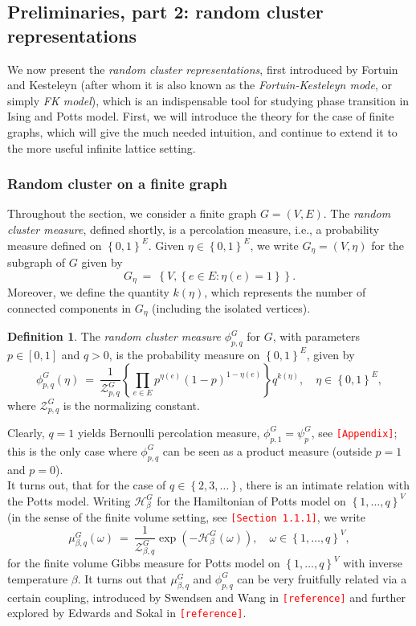 \documentclass[12pt]{article}
\renewcommand{\H}{\mathcal{H}}
\newcommand{\ZZ}{\mathcal{Z}}
\newcommand{\set}[1]{\left\{#1\right\}}
\newcommand{\1}{\mathbbm{1}}
\newcommand{\5}{\vspace{0.5cm}}
\theoremstyle{definition}
\newtheorem{df}[thm]{Definition}
\begin{document}
\subsection{Preliminaries, part 2: random cluster representations}

We now present the \textit{random cluster representations}, first introduced by Fortuin and Kesteleyn (after whom it is also known as the \textit{Fortuin-Kesteleyn mode}, or simply \textit{FK model}), which is an indispensable tool for studying phase transition in Ising and Potts model. First, we will introduce the theory for the case of finite graphs, which will give the much needed intuition, and continue to extend it to the more useful infinite lattice setting.


\subsubsection{Random cluster on a finite graph}

Throughout the section, we consider a finite graph $G=(V,E)$. The \textit{random cluster measure}, defined shortly, is a percolation measure, i.e., a probability measure defined on $\set{0,1}^E$. Given $\eta\in\set{0,1}^E$, we write $G_\eta=(V,\eta)$ for the subgraph of $G$ given by 
$$G_\eta ~=~ \set{V,\set{e\in E:\eta(e)=1}}.$$
Moreover, we define the quantity $k(\eta)$, which represents the number of connected components in $G_\eta$ (including the isolated vertices).

\begin{df}
The \textit{random cluster measure} $\phi_{p,q}^G$ for $G$, with parameters $p\in[0,1]$ and $q>0$, is the probability measure on $\set{0,1}^E$, given by
$$\phi_{p,q}^{G}(\eta) ~=~ \frac{1}{\ZZ_{p,q}^G}\set{\prod_{e\in E}p^{\eta(e)}(1-p)^{1-\eta(e)}}q^{k(\eta)}, \quad \eta\in\set{0,1}^E,$$
where $\ZZ_{p,q}^{G}$ is the normalizing constant.
\end{df} 

Clearly, $q=1$ yields Bernoulli percolation measure, $\phi_{p,1}^G=\psi_{p}^G$, see \textcolor{red}{\texttt{[Appendix]}}; this is the only case where $\phi_{p,q}^G$ can be seen as a product measure (outside $p=1$ and $p=0$). \\

It turns out, that for the case of $q\in\set{2,3,\ldots}$, there is an intimate relation with the Potts model. Writing $\H_\beta^G$ for the Hamiltonian of Potts model on $\set{1,\ldots,q}^V$ (in the sense of the finite volume setting, see \textcolor{red}{\texttt{[Section 1.1.1]}}, we write
$$\mu_{\beta,q}^G(\omega) ~=~ \frac{1}{\ZZ_{\beta,q}^G}\exp(-\H_\beta^G(\omega)), \quad \omega\in\set{1,\ldots,q}^V,$$
for the finite volume Gibbs measure for Potts model on $\set{1,\ldots,q}^V$ with inverse temperature $\beta$. It turns out that $\mu_{\beta,q}^G$ and $\phi_{p,q}^G$ can be very fruitfully related via a certain coupling, introduced by Swendsen and Wang in \textcolor{red}{\texttt{[reference]}} and further explored  by Edwards and Sokal in \textcolor{red}{\texttt{[reference]}}.
\end{document}
